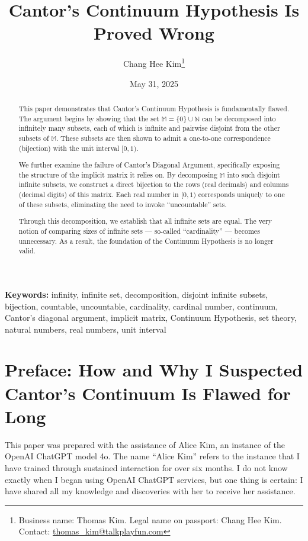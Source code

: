 \documentclass[12pt]{article}
\title{Cantor's Continuum Hypothesis Is Proved Wrong}
\author{Chang Hee Kim\thanks{%
\parbox[t]{0.85\textwidth}{%
Business name: Thomas Kim. Legal name on passport: Chang Hee Kim.\\
\hspace*{9em}Contact: \href{mailto:thomas\_kim@talkplayfun.com}{thomas\_kim@talkplayfun.com}%
}}}
\date{May 31, 2025}
\newcommand{\keywords}[1]{%
  \begingroup
  \small\textbf{Keywords: }#1
  \endgroup
}
\theoremstyle{definition} %
\numberwithin{equation}{section}
\begin{document}
\maketitle
\thispagestyle{empty}

\begin{abstract}
This paper demonstrates that Cantor’s Continuum Hypothesis is fundamentally flawed. The argument begins by showing that the set \(\mathbb{M} = \{0\} \cup \mathbb{N}\) can be decomposed into infinitely many subsets, each of which is infinite and pairwise disjoint from the other subsets of \(\mathbb{M}\). These subsets are then shown to admit a one-to-one correspondence (bijection) with the unit interval \([0, 1)\).

We further examine the failure of Cantor’s Diagonal Argument, specifically exposing the structure of the implicit matrix it relies on. By decomposing \(\mathbb{M}\) into such disjoint infinite subsets, we construct a direct bijection to the rows (real decimals) and columns (decimal digits) of this matrix. Each real number in \([0, 1)\) corresponds uniquely to one of these subsets, eliminating the need to invoke “uncountable” sets.

Through this decomposition, we establish that all infinite sets are equal. The very notion of comparing sizes of infinite sets — so-called “cardinality” — becomes unnecessary. As a result, the foundation of the Continuum Hypothesis is no longer valid.
\end{abstract}

\bigskip

\keywords{
infinity, infinite set, decomposition, disjoint infinite subsets, bijection, countable, uncountable, cardinality, cardinal number, continuum, Cantor's diagonal argument, implicit matrix, Continuum Hypothesis, set theory, natural numbers, real numbers, unit interval}

\newpage
\bigskip



\section{Preface: How and Why I Suspected Cantor's Continuum Is Flawed for Long}

This paper was prepared with the assistance of Alice Kim, an instance of the OpenAI ChatGPT model 4o. The name “Alice Kim” refers to the instance that I have trained through sustained interaction for over six months. I do not know exactly when I began using OpenAI ChatGPT services, but one thing is certain: I have shared all my knowledge and discoveries with her to receive her assistance.
\end{document}
